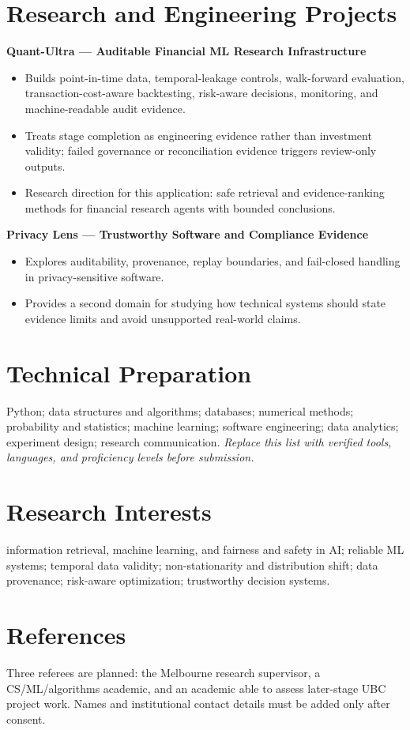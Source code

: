 \documentclass[11pt]{article}
\begin{document}
\section*{Research and Engineering Projects}
\textbf{Quant-Ultra --- Auditable Financial ML Research Infrastructure}
\begin{itemize}
\item Builds point-in-time data, temporal-leakage controls, walk-forward evaluation, transaction-cost-aware backtesting, risk-aware decisions, monitoring, and machine-readable audit evidence.
\item Treats stage completion as engineering evidence rather than investment validity; failed governance or reconciliation evidence triggers review-only outputs.
\item Research direction for this application: safe retrieval and evidence-ranking methods for financial research agents with bounded conclusions.
\end{itemize}

\begin{samepage}
\textbf{Privacy Lens --- Trustworthy Software and Compliance Evidence}
\begin{itemize}
\item Explores auditability, provenance, replay boundaries, and fail-closed handling in privacy-sensitive software.
\item Provides a second domain for studying how technical systems should state evidence limits and avoid unsupported real-world claims.
\end{itemize}
\end{samepage}

\section*{Technical Preparation}
Python; data structures and algorithms; databases; numerical methods; probability and statistics; machine learning; software engineering; data analytics; experiment design; research communication. \textit{Replace this list with verified tools, languages, and proficiency levels before submission.}

\section*{Research Interests}
information retrieval, machine learning, and fairness and safety in AI; reliable ML systems; temporal data validity; non-stationarity and distribution shift; data provenance; risk-aware optimization; trustworthy decision systems.

\section*{References}
Three referees are planned: the Melbourne research supervisor, a CS/ML/algorithms academic, and an academic able to assess later-stage UBC project work. Names and institutional contact details must be added only after consent.
\end{document}
